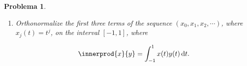 \documentclass[12pt]{article}
\theoremstyle{break}
\newtheorem{exercise}{Problema}
\theoremstyle{nonumberbreak}
\newcommand*{\e}{\mathrm{e}} %
\begin{document}
\begin{exercise}
\begin{enumerate}[label = (\alph*)]
            \begin{equation*}
                y = \sum_{k = 1}^{n} \alpha_{k}e_{k}
                \condition*{\alpha_{k} = \innerprod{x}{e_{k}}}
            \end{equation*}

            is orthogonal to the subspace \(Y_{n} = \textrm{span}\left\lbrace e_{1}, \dots, \e_{n}\right\rbrace\).

            \item Orthonormalize the first three terms of the sequence \((x_{0}, x_{1}, x_{2}, \cdots)\), where \(x_{j}(t) = t^{j}\), on the interval \([-1, 1]\), where
            
            \begin{equation*}
                \innerprod{x}{y} = \int_{-1}^{1} x(t)y(t)\odif{t}.
            \end{equation*}
        \end{enumerate}
    \end{exercise}
\end{document}
